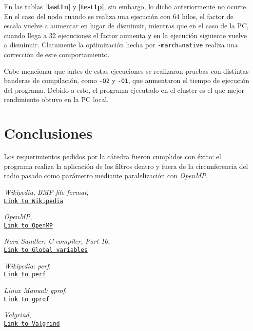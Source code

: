 \documentclass[12pt,a4paper]{article}
\begin{document}
En las tablas \textbf{\ref{test1n}} y \textbf{\ref{test1p}}, sin embargo, lo
dicho anteriormente no ocurre. En el caso del nodo cuando se realiza una
ejecución con 64 hilos, el factor de escala vuelve a aumentar en lugar de
disminuir, mientras que en el caso de la PC, cuando llega a 32 ejecuciones el
factor aumenta y en la ejecución siguiente vuelve a disminuir. Claramente la
optimización hecha por \verb|-march=native| realiza una corrección de este
comportamiento.

Cabe mencionar que antes de estas ejecuciones se realizaron pruebas con distintas
banderas de compilación, como \verb|-O2| y \verb|-O1|, que aumentaron el tiempo
de ejecución del programa. Debido a esto, el programa ejecutado en el cluster es
el que mejor rendimiento obtuvo en la PC local.

\section{Conclusiones}
\label{conc}
Los requerimientos pedidos por la cátedra fueron cumplidos con éxito: el programa
realiza la aplicación de los filtros dentro y fuera de la circunferencia del radio
pasado como parámetro mediante paralelización con \emph{OpenMP}.


\begin{thebibliography}{9}
\emph{Wikipedia, BMP file format},
\\\texttt{\href{https://en.wikipedia.org/wiki/BMP_file_format}{Link to Wikipedia}}

\emph{OpenMP},
\\\texttt{\href{https://www.openmp.org/}{Link to OpenMP}}

\emph{Nora Sandler: C compiler, Part 10},
\\\texttt{\href{https://norasandler.com/2019/02/18/Write-a-Compiler-10.html}{Link to Global variables}}

\emph{Wikipedia: perf},
\\\texttt{\href{https://en.wikipedia.org/wiki/Perf_(Linux)}{Link to perf}}

\emph{Linux Manual: gprof},
\\\texttt{\href{https://linux.die.net/man/1/gprof}{Link to gprof}}

\emph{Valgrind},
\\\texttt{\href{http://valgrind.org/}{Link to Valgrind}}
\end{thebibliography}
\end{document}
